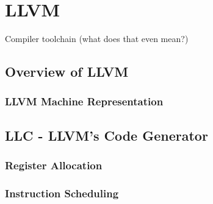 \section{LLVM}
Compiler toolchain (what does that even mean?)

\subsection{Overview of LLVM}

\subsubsection{LLVM Machine Representation}

\subsection{LLC - LLVM's Code Generator}

\subsubsection{Register Allocation}

\subsubsection{Instruction Scheduling}
